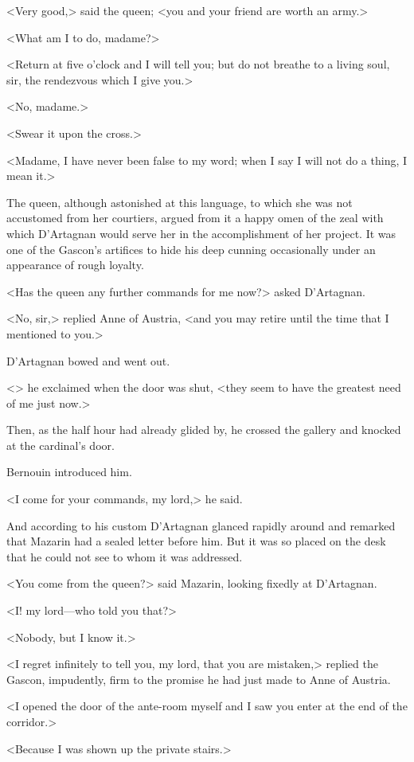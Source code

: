 <Very good,> said the queen; <you and your friend are worth an army.>

<What am I to do, madame?>

<Return at five o'clock and I will tell you; but do not breathe to a living soul, sir, the rendezvous which I give you.>

<No, madame.>

<Swear it upon the cross.>

<Madame, I have never been false to my word; when I say I will not do a thing, I mean it.>

The queen, although astonished at this language, to which she was not accustomed from her courtiers, argued from it a happy omen of the zeal with which D'Artagnan would serve her in the accomplishment of her project. It was one of the Gascon's artifices to hide his deep cunning occasionally under an appearance of rough loyalty.

<Has the queen any further commands for me now?> asked D'Artagnan.

<No, sir,> replied Anne of Austria, <and you may retire until the time that I mentioned to you.>

D'Artagnan bowed and went out.

<> he exclaimed when the door was shut, <they seem to have the greatest need of me just now.>

Then, as the half hour had already glided by, he crossed the gallery and knocked at the cardinal's door.

Bernouin introduced him.

<I come for your commands, my lord,> he said.

And according to his custom D'Artagnan glanced rapidly around and remarked that Mazarin had a sealed letter before him. But it was so placed on the desk that he could not see to whom it was addressed.

<You come from the queen?> said Mazarin, looking fixedly at D'Artagnan.

<I\@! my lord—who told you that?>

<Nobody, but I know it.>

<I regret infinitely to tell you, my lord, that you are mistaken,> replied the Gascon, impudently, firm to the promise he had just made to Anne of Austria.

<I opened the door of the ante-room myself and I saw you enter at the end of the corridor.>

<Because I was shown up the private stairs.>

